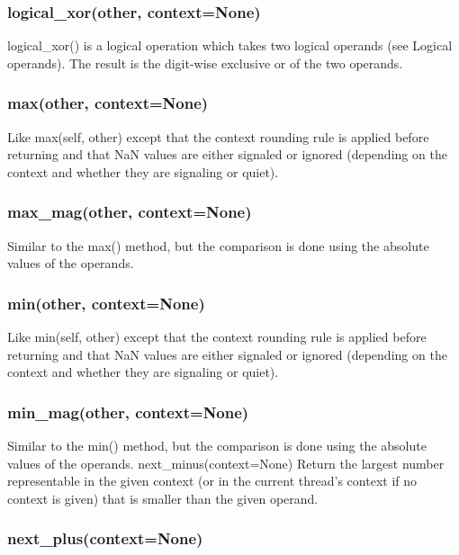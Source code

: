 \subsubsection{logical\_xor(other, context=None)}

logical\_xor() is a logical operation which takes two logical operands (see Logical operands). The result is the digit-wise exclusive or of the two operands.

\subsubsection{max(other, context=None)}

Like max(self, other) except that the context rounding rule is applied before returning and that NaN values are either signaled or ignored (depending on the context and whether they are signaling or quiet).

\subsubsection{max\_mag(other, context=None)}

Similar to the max() method, but the comparison is done using the absolute values of the operands.

\subsubsection{min(other, context=None)}

Like min(self, other) except that the context rounding rule is applied before returning and that NaN values are either signaled or ignored (depending on the context and whether they are signaling or quiet).

\subsubsection{min\_mag(other, context=None)}

Similar to the min() method, but the comparison is done using the absolute values of the operands.
next\_minus(context=None)
Return the largest number representable in the given context (or in the current thread’s context if no context is given) that is smaller than the given operand.

\subsubsection{next\_plus(context=None)}

